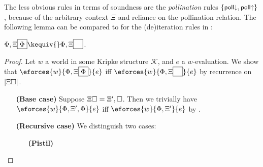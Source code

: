 The less obvious rules in terms of soundness are the \emph{pollination} rules
$\{\text{\small$\mathsf{poll{\downarrow}}$},\text{\small$\mathsf{poll{\uparrow}}$}\}$, because of the arbitrary context $\Xi$
and reliance on the pollination relation. The following lemma can be compared to
 for the (de)iteration rules in :

\begin{lemma}
  $\Phi, \Xi\select{\Phi} \kequiv{} \Phi, \Xi\select{\phantom{\Phi}}$.
\end{lemma}
\begin{proof}
  Let $w$ a world in some Kripke structure $\mathcal{K}$, and $e$ a
  $w$-evaluation. We show that $\eforces{w}{\Phi, \Xi\select{\Phi}}{e}$ iff
  $\eforces{w}{\Phi, \Xi{\select{\phantom{\Phi}}}}{e}$ by recurrence on
  $\left|\Xi\square\right|$.
  \begin{itemize}
    \item[\textbf{(Base case)}]
      Suppose $\Xi\square = \Xi', \square$. Then we trivially have
      $\eforces{w}{\Phi, \Xi', \Phi}{e}$ iff $\eforces{w}{\Phi, \Xi'}{e}$ by
      .
    \item[\textbf{(Recursive case)}]
      We distinguish two cases:
      \begin{itemize}
        \item[\textbf{(Pistil)}]
          \newcommand{\FillXi}[1]{\Xi', (\flower{\garden{\bx}{#1}}{\Delta})}
          \newcommand{\rFillXi}[1]{\flower{\garden{\bx}{#1}}{\Delta}}

          \newcommand{\fillXi}[1]{\FillXi{\Xi_0\select{#1}}}
          \newcommand{\rfillXi}[1]{\rFillXi{\Xi_0\select{#1}}}
          \newcommand{\ffillXi}[1]{\Xi\select{#1}}


\end{itemize}
\end{itemize}
\end{proof}
